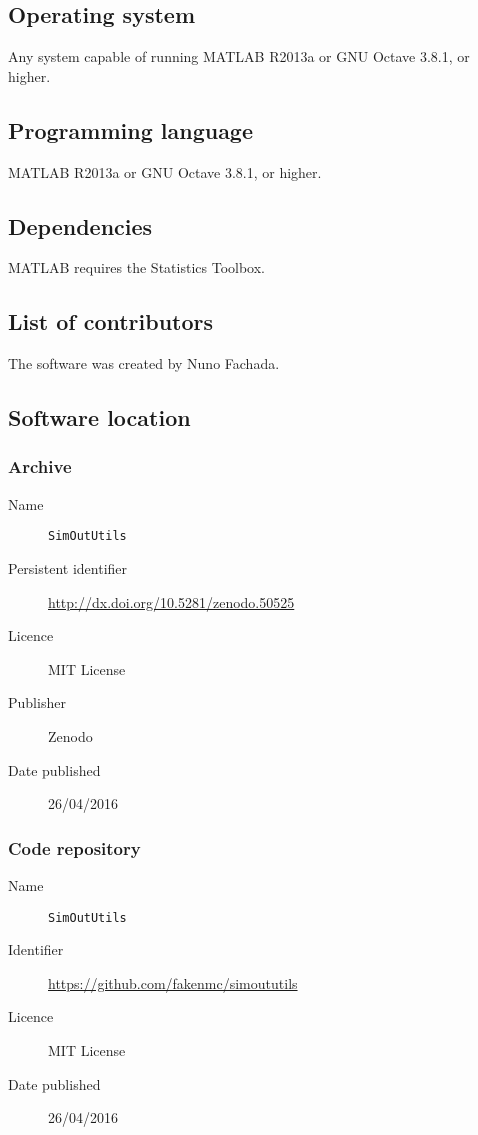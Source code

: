 \documentclass{article}
\newcommand{\swpackage}{\texttt}
\begin{document}
\subsection*{Operating system}
Any system capable of running MATLAB R2013a or GNU Octave 3.8.1, or higher.

\subsection*{Programming language}
MATLAB R2013a or GNU Octave 3.8.1, or higher.

\subsection*{Dependencies}
MATLAB requires the Statistics Toolbox.

\subsection*{List of contributors}
The software was created by Nuno Fachada.

\subsection*{Software location}

\subsubsection*{Archive}

\begin{description}

\item[Name] \swpackage{SimOutUtils}
\item[Persistent identifier] \url{http://dx.doi.org/10.5281/zenodo.50525}
\item[Licence] MIT License
\item[Publisher] Zenodo
\item[Date published] 26/04/2016

\end{description}

\subsubsection*{Code repository}

\begin{description}

\item[Name] \swpackage{SimOutUtils}
\item[Identifier] \url{https://github.com/fakenmc/simoututils}
\item[Licence] MIT License
\item[Date published] 26/04/2016

\end{description}
\end{document}
